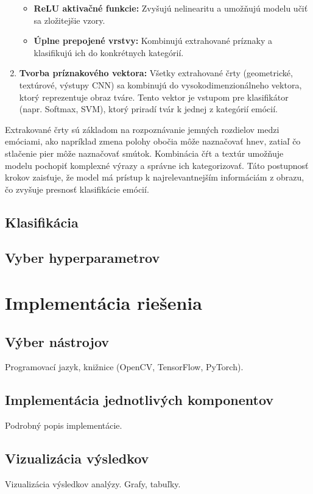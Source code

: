 \begin{enumerate}
\begin{itemize}
        \item \textbf{ReLU aktivačné funkcie:} Zvyšujú nelinearitu a umožňujú modelu učiť sa zložitejšie vzory.
        \item \textbf{Úplne prepojené vrstvy:} Kombinujú extrahované príznaky a klasifikujú ich do konkrétnych kategórií.
    \end{itemize}
    \item \textbf{Tvorba príznakového vektora:} Všetky extrahované črty (geometrické, textúrové, výstupy CNN) sa kombinujú do vysokodimenzionálneho vektora, ktorý reprezentuje obraz tváre. Tento vektor je vstupom pre klasifikátor (napr. Softmax, SVM), ktorý priradí tvár k jednej z kategórií emócií.
\end{enumerate}
Extrakované črty sú základom na rozpoznávanie jemných rozdielov medzi emóciami, ako napríklad zmena polohy obočia môže naznačovať hnev, zatiaľ čo stlačenie pier 
môže naznačovať smútok. Kombinácia čŕt a textúr umožňuje modelu pochopiť komplexné výrazy a správne ich kategorizovať. Táto postupnosť krokov zaisťuje, že model má prístup k najrelevantnejším informáciám z obrazu, čo zvyšuje presnosť klasifikácie emócií.

\subsection{Klasifikácia}
\subsection{Vyber hyperparametrov}

\section{Implementácia riešenia}
\subsection{Výber nástrojov}Programovací jazyk, knižnice (OpenCV, TensorFlow, PyTorch).
\subsection{Implementácia jednotlivých komponentov}Podrobný popis implementácie.
\subsection{Vizualizácia výsledkov}Vizualizácia výsledkov analýzy. Grafy, tabuľky.

